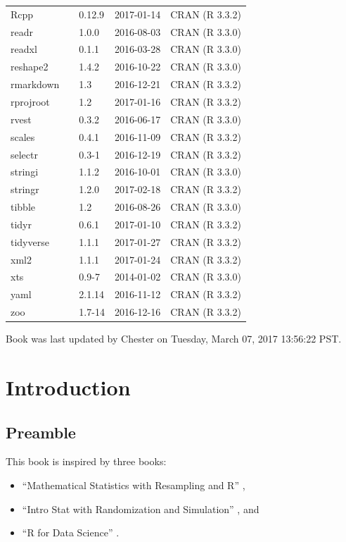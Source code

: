 \documentclass[]{tufte-book}
\providecommand{\tightlist}{%
  \setlength{\itemsep}{0pt}\setlength{\parskip}{0pt}}
\begin{document}
\begin{longtable}{lllll}
\addlinespace
Rcpp &  & 0.12.9 & 2017-01-14 & CRAN (R 3.3.2)\\
readr &  & 1.0.0 & 2016-08-03 & CRAN (R 3.3.0)\\
readxl &  & 0.1.1 & 2016-03-28 & CRAN (R 3.3.0)\\
reshape2 &  & 1.4.2 & 2016-10-22 & CRAN (R 3.3.0)\\
rmarkdown &  & 1.3 & 2016-12-21 & CRAN (R 3.3.2)\\
\addlinespace
rprojroot &  & 1.2 & 2017-01-16 & CRAN (R 3.3.2)\\
rvest &  & 0.3.2 & 2016-06-17 & CRAN (R 3.3.0)\\
scales &  & 0.4.1 & 2016-11-09 & CRAN (R 3.3.2)\\
selectr &  & 0.3-1 & 2016-12-19 & CRAN (R 3.3.2)\\
stringi &  & 1.1.2 & 2016-10-01 & CRAN (R 3.3.0)\\
\addlinespace
stringr &  & 1.2.0 & 2017-02-18 & CRAN (R 3.3.2)\\
tibble &  & 1.2 & 2016-08-26 & CRAN (R 3.3.0)\\
tidyr &  & 0.6.1 & 2017-01-10 & CRAN (R 3.3.2)\\
tidyverse &  & 1.1.1 & 2017-01-27 & CRAN (R 3.3.2)\\
xml2 &  & 1.1.1 & 2017-01-24 & CRAN (R 3.3.2)\\
\addlinespace
xts &  & 0.9-7 & 2014-01-02 & CRAN (R 3.3.0)\\
yaml &  & 2.1.14 & 2016-11-12 & CRAN (R 3.3.2)\\
zoo &  & 1.7-14 & 2016-12-16 & CRAN (R 3.3.2)\\
\bottomrule
\end{longtable}

Book was last updated by Chester on Tuesday, March 07, 2017 13:56:22
PST.

\chapter{Introduction}\label{intro}

\section{Preamble}\label{preamble-1}

This book is inspired by three books:

\begin{itemize}
\tightlist
\item
  ``Mathematical Statistics with Resampling and R'' \citep{hester2011},
\item
  ``Intro Stat with Randomization and Simulation'' \citep{isrs2014}, and
\item
  ``R for Data Science'' \citep{rds2016}.
\end{itemize}
\end{document}
